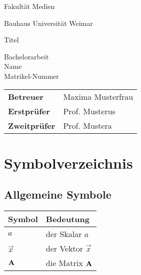 
\pagestyle{empty}

\clearscrheadings\clearscrplain

\nocite{*}

\begin{center}
\begin{Huge}
Fakultät Medien\\
\vspace{3mm}
\end{Huge}{\Large Bauhaus Universität Weimar}\\

\vspace{20mm}
\begin{Large}
Titel\\
\end{Large}
\vspace{8mm}
Bachelorarbeit\\
\vspace{0.4cm}
\vspace{2 cm}
Name \\
Matrikel-Nummer\\
\vspace{8cm}
\begin{tabular}{ll}
{\bf Betreuer} & Maxima Musterfrau\\
{\bf Erstprüfer}&Prof. Musterus\\
{\bf Zweitprüfer}&Prof. Mustera\\
\end{tabular}

\end{center}
\clearpage


\pagestyle{useheadings} %

\tableofcontents
\listoffigures
\listoftables

\chapter*{Symbolverzeichnis}\label{s.sym}
\section*{Allgemeine Symbole}\label{s.sym.alg}
\begin{flushleft}\begin{tabularx}{\textwidth}{l|X}
Symbol & Bedeutung\\\hline
$a$ & der Skalar $a$ \\
$\vec{x}$ & der Vektor $\vec{x}$\\
${\textbf{A}}$ & die Matrix ${\textbf{A}}$\\
\end{tabularx}\end{flushleft}

